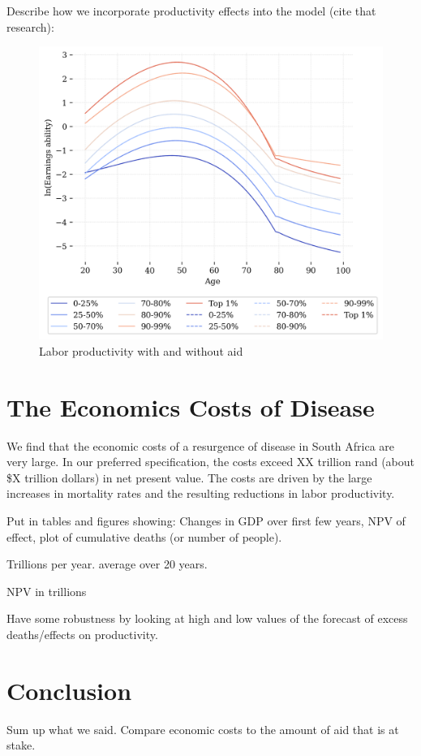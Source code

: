 \documentclass[letterpaper,12pt]{article}
\theoremstyle{definition}
\begin{document}
\begin{spacing}{1.5}
Describe how we incorporate productivity effects into the model (cite that research):

\begin{figure}[h]
    \caption{Labor productivity with and without aid}
    \centering
    \includegraphics[scale=0.75]{./tables_figures/ability_profiles.png}
\end{figure}

\section{The Economics Costs of Disease}\label{SecResults}

We find that the economic costs of a resurgence of disease in South Africa are very large.  In our preferred specification, the costs exceed XX trillion rand (about \$X trillion dollars) in net present value.  The costs are driven by the large increases in mortality rates and the resulting reductions in labor productivity.

Put in tables and figures showing: Changes in GDP over first few years, NPV of effect, plot of cumulative deaths (or number of people).

Trillions per year. average over 20 years.


NPV in trillions


Have some robustness by looking at high and low values of the forecast of excess deaths/effects on productivity.

\section{Conclusion}\label{SecConc}

Sum up what we said.  Compare economic costs to the amount of aid that is at stake.

\end{spacing}
\newpage

\end{document}
